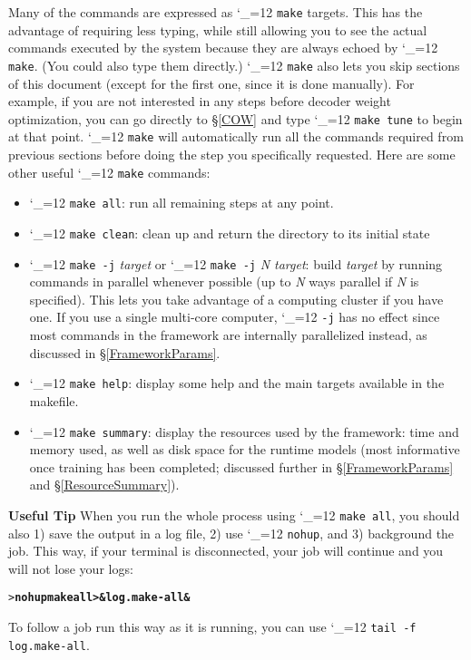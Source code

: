 \documentclass[11pt,letterpaper]{article}
\def\code{\begingroup\catcode`\_=12 \codex}
\newcommand{\codex}[1]{\texttt{#1}\endgroup}
\newcommand{\tip}{\textbf{Useful Tip \large{\ding{43}} }}
\newcommand{\margintip}{\marginpar[{\textbf{Tip \large{\ding{43}}}}]{\textbf{\reflectbox{\large{\ding{43}}} Tip}}}
\newcommand{\tipend}{\textbf{ \reflectbox{\large{\ding{43}}}}}
\begin{document}
Many of the commands are expressed as \code{make} targets. This has the
advantage of requiring less typing, while still allowing you to see the actual
commands executed by the system because they are always echoed by \code{make}.
(You could also type them directly.) \code{make} also lets you skip
sections of this document (except for the first one, since it is done
manually). For example, if you are not interested in any steps before decoder
weight optimization, you can go directly to \S\ref{COW} and type
\code{make tune} to begin at that point. \code{make} will automatically run all
the commands required from previous sections before doing the step you
specifically requested. Here are some other useful \code{make} commands:
\begin{itemize}
\item \code{make all}: run all remaining steps at any point.
\item \code{make clean}: clean up and return the directory to its initial state
\item \code{make -j} \emph{target} or \code{make -j} \emph{N target}: build
      \emph{target} by running commands in parallel whenever possible (up to
      \emph{N} ways parallel if \emph{N} is specified). This lets you take
      advantage of a computing cluster if you have one. If you use a single
      multi-core computer, \code{-j} has no effect since most commands in the
      framework are internally parallelized instead, as discussed in
      \S\ref{FrameworkParams}.
\item \code{make help}: display some help and the main targets available in
      the makefile.
\item \code{make summary}: display the resources used by the framework: time
      and memory used, as well as disk space for the runtime models (most
      informative once training has been completed; discussed further in
      \S\ref{FrameworkParams} and \S\ref{ResourceSummary}).
\end{itemize}

\tip\margintip When you run the whole process using \code{make all}, you should
also 1) save the output in a log file, 2) use \code{nohup}, and 3) background
the job. This way, if your terminal is disconnected, your job will continue and
you will not lose your logs:
\begin{small}
\begin{alltt}
   > \textbf{nohup make all >& log.make-all &}
\end{alltt}
\end{small}
To follow a job run this way as it is running, you can use \code{tail -f
log.make-all}.\tipend
\end{document}
